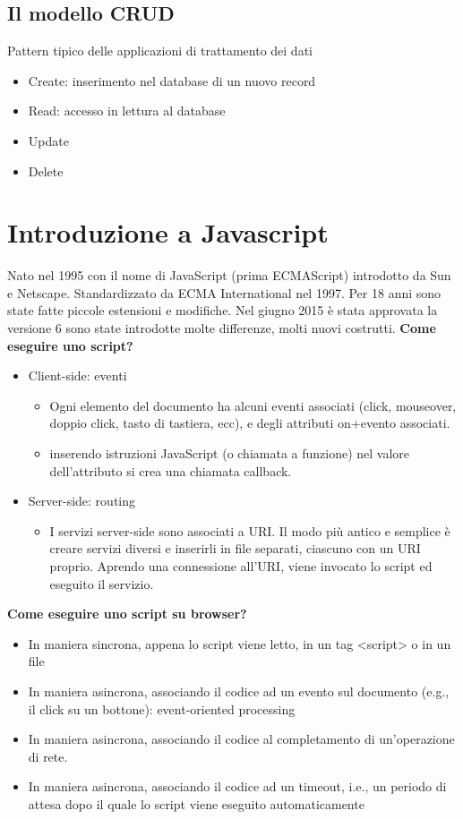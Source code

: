 \documentclass[a4paper,12pt]{article}
\begin{document}
\subsection*{Il modello CRUD}
Pattern tipico delle applicazioni di trattamento dei dati
\begin{itemize}
  \item Create: inserimento nel database di un nuovo record
  \item Read: accesso in lettura al database
  \item Update
  \item Delete
\end{itemize}
\section{Introduzione a Javascript}
Nato nel 1995 con il nome di JavaScript (prima ECMAScript) introdotto da Sun e Netscape. Standardizzato da ECMA International nel 1997. Per 18 anni sono state fatte piccole estensioni e modifiche. Nel giugno 2015 è stata approvata la versione 6  sono state introdotte molte differenze, molti nuovi costrutti.
\textbf{Come eseguire uno script?}
\begin{itemize}
  \item Client-side: eventi
  \begin{itemize}
    \item Ogni elemento del documento ha alcuni eventi associati (click, mouseover, doppio click, tasto di tastiera, ecc), e degli attributi on+evento associati.
    \item inserendo istruzioni JavaScript (o chiamata a funzione) nel valore dell'attributo si crea una chiamata callback.
  \end{itemize}
  \item Server-side: routing
  \begin{itemize}
    \item I servizi server-side sono associati a URI. Il modo più antico e semplice è creare servizi diversi e inserirli in file separati, ciascuno con un URI proprio. Aprendo una connessione all'URI, viene invocato lo script ed eseguito il servizio.
  \end{itemize}
\end{itemize}
\textbf{Come eseguire uno script su browser?}
\begin{itemize}
  \item In maniera sincrona, appena lo script viene letto, in un tag <script> o in un file
  \item In maniera asincrona, associando il codice ad un evento sul documento (e.g., il click su un bottone): event-oriented processing
  \item In maniera asincrona, associando il codice al completamento di un’operazione di rete.
  \item In maniera asincrona, associando il codice ad un timeout, i.e., un periodo di attesa dopo il quale lo script viene eseguito automaticamente
\end{itemize}
\end{document}
